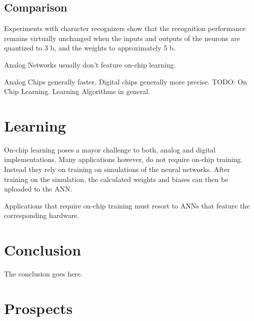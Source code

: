 \documentclass[conference]{IEEEtran}
\begin{document}
    \subsection{Comparison}
    Experiments with character recognizers show that the recognition performance remains virtually unchanged when the inputs and outputs of
    the neurons are quantized to 3 b, and the weights to approximately 5 b. \cite{boser1991analog}

    Analog Networks usually don't feature on-chip learning. \cite{ms1990digital}

    Analog Chips generally faster.
    Digital chips generally more precise.
    TODO: On Chip Learning. Learning Algorithms in general.

    \section{Learning}

    On-chip learning poses a mayor challenge to both, analog and digital implementations.
    Many applications however, do not require on-chip training.
    Instead they rely on training on simulations of the neural networks.
    After training on the simulation, the calculated weights and biases can then be uploaded to the ANN\@.

    Applications that require on-chip training must resort to ANNs that feature the corresponding hardware.



    \section{Conclusion}
    The conclusion goes here.

    \section*{Prospects}
\end{document}
